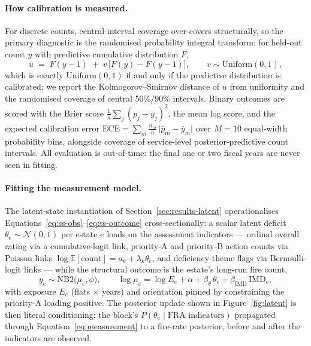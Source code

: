 \paragraph{How calibration is measured.} For discrete counts, central-interval
coverage over-covers structurally, so the primary diagnostic is the randomised
probability integral transform: for held-out count $y$ with predictive
cumulative distribution $F$,
\begin{equation}
  u \;=\; F(y-1) \;+\; v\,\big[F(y) - F(y-1)\big],
  \qquad v \sim \mathrm{Uniform}(0,1),
  \label{eq:pit}
\end{equation}
which is exactly $\mathrm{Uniform}(0,1)$ if and only if the predictive
distribution is calibrated; we report the Kolmogorov--Smirnov distance of $u$
from uniformity and the randomised coverage of central 50\%/90\% intervals.
Binary outcomes are scored with the Brier score
$\tfrac1n\sum_j (p_j - y_j)^2$, the mean log score, and the expected
calibration error $\mathrm{ECE} = \sum_m \tfrac{n_m}{n}\,
\lvert \bar p_m - \bar y_m \rvert$ over $M{=}10$ equal-width probability
bins, alongside coverage of service-level posterior-predictive count
intervals. All evaluation is out-of-time: the final one or two fiscal years
are never seen in fitting.

\paragraph{Fitting the measurement model.} The latent-state instantiation of
Section~\ref{sec:results-latent} operationalises
Equations~\eqref{eq:ss-obs}--\eqref{eq:ss-outcome} cross-sectionally: a scalar
latent deficit $\theta_e \sim \mathcal{N}(0,1)$ per estate $e$ loads on the
assessment indicators --- ordinal overall rating via a cumulative-logit link,
priority-A and priority-B action counts via Poisson links
$\log \mathbb{E}[\text{count}] = a_k + \lambda_k \theta_e$, and
deficiency-theme flags via Bernoulli-logit links --- while the structural
outcome is the estate's long-run fire count,
\begin{equation}
  y_e \sim \mathrm{NB2}\big(\mu_e, \phi\big), \qquad
  \log \mu_e = \log E_e + \alpha + \beta_\theta\, \theta_e
  + \beta_{\mathrm{IMD}}\, \mathrm{IMD}_e,
  \label{eq:measurement}
\end{equation}
with exposure $E_e$ (flats $\times$ years) and orientation pinned by
constraining the priority-A loading positive. The posterior update shown in
Figure~\ref{fig:latent} is then literal conditioning: the block's
$P(\theta_e \mid \text{FRA indicators})$ propagated through
Equation~\eqref{eq:measurement} to a fire-rate posterior, before and after the
indicators are observed.
